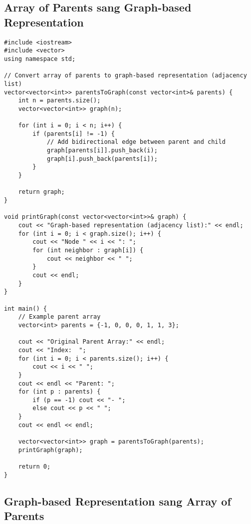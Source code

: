\documentclass[12pt]{article}
\begin{document}
\subsection{Array of Parents sang Graph-based Representation}

\begin{lstlisting}[caption={Chuyển đổi từ Array of Parents sang Graph-based Representation}]
#include <iostream>
#include <vector>
using namespace std;

// Convert array of parents to graph-based representation (adjacency list)
vector<vector<int>> parentsToGraph(const vector<int>& parents) {
    int n = parents.size();
    vector<vector<int>> graph(n);
    
    for (int i = 0; i < n; i++) {
        if (parents[i] != -1) {
            // Add bidirectional edge between parent and child
            graph[parents[i]].push_back(i);
            graph[i].push_back(parents[i]);
        }
    }
    
    return graph;
}

void printGraph(const vector<vector<int>>& graph) {
    cout << "Graph-based representation (adjacency list):" << endl;
    for (int i = 0; i < graph.size(); i++) {
        cout << "Node " << i << ": ";
        for (int neighbor : graph[i]) {
            cout << neighbor << " ";
        }
        cout << endl;
    }
}

int main() {
    // Example parent array
    vector<int> parents = {-1, 0, 0, 0, 1, 1, 3};
    
    cout << "Original Parent Array:" << endl;
    cout << "Index:  ";
    for (int i = 0; i < parents.size(); i++) {
        cout << i << " ";
    }
    cout << endl << "Parent: ";
    for (int p : parents) {
        if (p == -1) cout << "- ";
        else cout << p << " ";
    }
    cout << endl << endl;
    
    vector<vector<int>> graph = parentsToGraph(parents);
    printGraph(graph);
    
    return 0;
}
\end{lstlisting}

\subsection{Graph-based Representation sang Array of Parents}
\end{document}
